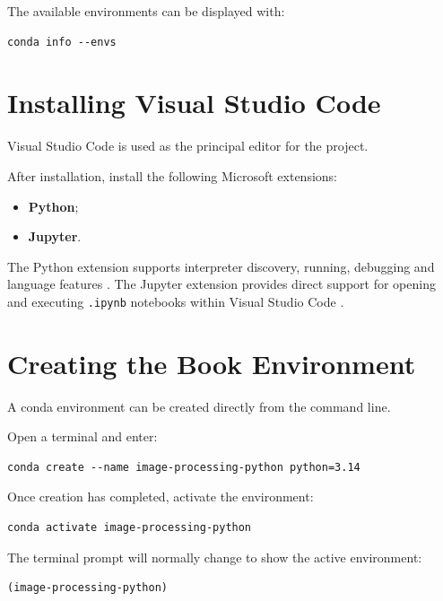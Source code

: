 The available environments can be displayed with:

\begin{verbatim}
conda info --envs
\end{verbatim}


\section{Installing Visual Studio Code}
\label{sec:install-vscode}

Visual Studio Code is used as the principal editor for the project.

After installation, install the following Microsoft extensions:

\begin{itemize}
    \item \textbf{Python};
    \item \textbf{Jupyter}.
\end{itemize}

The Python extension supports interpreter discovery, running,
debugging and language features \cite{vscode_python}. The Jupyter
extension provides direct support for opening and executing
\texttt{.ipynb} notebooks within Visual Studio Code
\cite{vscode_jupyter}.


\section{Creating the Book Environment}
\label{sec:create-conda-environment}

A conda environment can be created directly from the command line.

Open a terminal and enter:

\begin{verbatim}
conda create --name image-processing-python python=3.14
\end{verbatim}

Once creation has completed, activate the environment:

\begin{verbatim}
conda activate image-processing-python
\end{verbatim}

The terminal prompt will normally change to show the active
environment:

\begin{verbatim}
(image-processing-python)
\end{verbatim}

